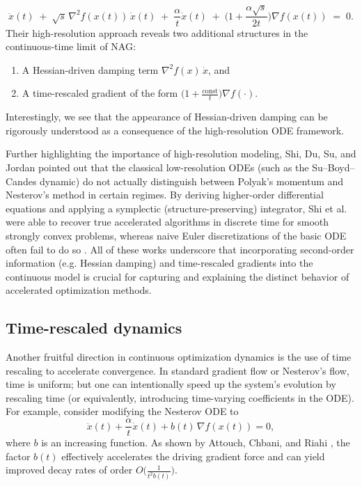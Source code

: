 \documentclass[11pt]{article}
\numberwithin{equation}{section}
\begin{document}
\[
\ddot x(t)\;+\;{\sqrt{s}\,\nabla^2 f(x(t))\,\dot x(t)}\;+\;\frac{\alpha}{t}\dot x(t)\;+\;\Big(1+\frac{\alpha\sqrt{s}}{2t}\Big)\nabla f(x(t))\;=\;0.
\]
Their high-resolution approach reveals two additional structures in the continuous-time limit of NAG:
\begin{enumerate}
    \item A {Hessian-driven damping} term \(\nabla^2 f(x)\,\dot x\), and
    \item A {time-rescaled gradient} of the form \(\big(1+\tfrac{\mathrm{const}}{t}\big)\nabla f(\cdot)\).
\end{enumerate}
Interestingly, we see that the appearance of Hessian-driven damping can be rigorously understood as a consequence of the high-resolution ODE framework. 

Further highlighting the importance of high-resolution modeling, Shi, Du, Su, and Jordan \cite{Shi2019} pointed out that the classical low-resolution ODEs (such as the Su–Boyd–Candes dynamic) do not actually distinguish between Polyak’s momentum and Nesterov’s method in certain regimes. By deriving higher-order differential equations and applying a symplectic (structure-preserving) integrator, Shi et al. were able to recover true accelerated algorithms in discrete time for smooth strongly convex problems, whereas naive Euler discretizations of the basic ODE often fail to do so \cite{Shi2019}. All of these works underscore that incorporating second-order information (e.g. Hessian damping) and time-rescaled gradients into the continuous model is crucial for capturing and explaining the distinct behavior of accelerated optimization methods.
\subsection{Time-rescaled dynamics}
Another fruitful direction in continuous optimization dynamics is the use of {time rescaling} to accelerate convergence. In standard gradient flow or Nesterov’s flow, time is uniform; but one can intentionally speed up the system’s evolution by rescaling time (or equivalently, introducing time-varying coefficients in the ODE). For example, consider modifying the Nesterov ODE to
\[
\ddot{x}(t)+\frac{\alpha}{t}\dot{x}(t)+b(t)\,\nabla f(x(t))=0,
\]
where $b$ is an increasing function. As shown by Attouch, Chbani, and Riahi \cite{AttouchRiahi2019}, the factor $b(t)$ effectively accelerates the driving gradient force and can yield improved decay rates of order $O\big(\frac{1}{t^2b(t)}\big)$.
\end{document}
